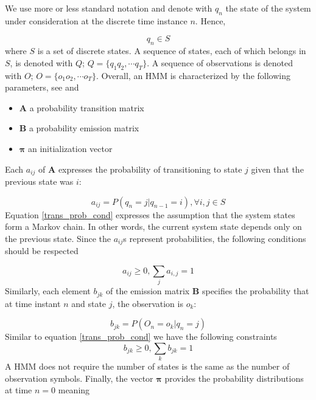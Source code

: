 We use more or less standard notation and denote with $q_n$ the state of the system under consideration at the discrete time instance $n$. Hence,

\begin{equation}
q_n \in S
\end{equation}
where $S$ is a set of discrete states. A sequence of states, each of which belongs in $S$, is denoted with $Q$; $Q=\{q_1q_2,\cdots q_T\}$. A sequence of observations is denoted with $O$; $O=\{o_1o_2,\cdots o_T\}$.
Overall, an HMM is characterized by the following parameters, see \cite{rabiner2009} and \cite{koski}

\begin{itemize}
	\item $\mathbf{A}$ a probability transition matrix
	\item $\mathbf{B}$ a probability emission matrix
	\item $\boldsymbol{\pi}$ an initialization vector
\end{itemize}
Each $a_{ij}$ of $\mathbf{A}$  expresses the probability of transitioning to state $j$ given that the previous state was $i$:

\begin{equation}
a_{ij} = P(q_n = j | q_{n-1} = i), \forall i,j \in S
\label{trans_prob_cond}
\end{equation}
Equation \ref{trans_prob_cond} expresses the assumption that the system states form a Markov chain. In other words, the current system state depends only on the previous state.
Since the $a_{ij}$s represent probabilities, the following conditions should be respected \cite{koski}

\begin{equation}
a_{ij} \geq 0, \sum_{j} a_{i,j} = 1 
\end{equation}
Similarly, each element $b_{jk}$ of the emission matrix $\mathbf{B}$ specifies the probability that at time instant $n$ and state $j$, the observation is $o_k$:

\begin{equation}
b_{jk} = P(O_n = o_k | q_n = j)
\end{equation}
Similar to equation \ref{trans_prob_cond} we have the following constraints
\begin{equation}
b_{jk} \geq 0, \sum_{k} b_{jk} = 1 
\label{emiss_prob_cond}
\end{equation}
A HMM does not require the number of states is the same as the number of observation symbols.
Finally, the vector $\boldsymbol{\pi}$ provides the probability distributions at time $n=0$ meaning 

